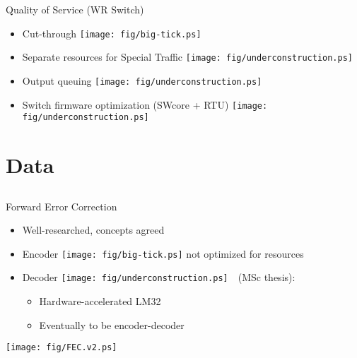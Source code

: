 \documentclass[compress,red]{beamer}
\begin{document}
\begin{frame}{Quality of Service (WR Switch)}

  \begin{itemize}
    \item Cut-through \texttt{[image: fig/big-tick.ps]}
    \item Separate resources for Special Traffic \texttt{[image: fig/underconstruction.ps]}
    \item Output queuing \texttt{[image: fig/underconstruction.ps]}
    \item Switch firmware optimization (SWcore + RTU) \texttt{[image: fig/underconstruction.ps]}
  \end{itemize}

\end{frame}

\section{Data}
\subsection{}
\begin{frame}{Forward Error Correction}

  \begin{itemize}
    \item Well-researched, concepts agreed
    \item Encoder \texttt{[image: fig/big-tick.ps]}  not optimized for resources
    \item Decoder \texttt{[image: fig/underconstruction.ps]}~~(MSc thesis):
    \begin{itemize}
      \item Hardware-accelerated LM32
      \item Eventually to be encoder-decoder
    \end{itemize}

  \end{itemize}

      \begin{center}
	\texttt{[image: fig/FEC.v2.ps]}
      \end{center}  

\end{frame}
\end{document}
